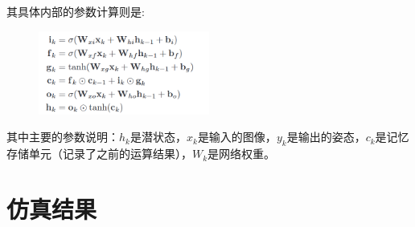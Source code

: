 其具体内部的参数计算则是:
\begin{figure}[H]
	\centering
	\includegraphics[width=0.5\textwidth]{images/deepvo/fuc2.png}
\end{figure}

其中主要的参数说明：$h_k$是潜状态，$x_k$是输入的图像，$y_k$是输出的姿态，$c_k$是记忆存储单元（记录了之前的运算结果），$W_k$是网络权重。

\section{仿真结果}

